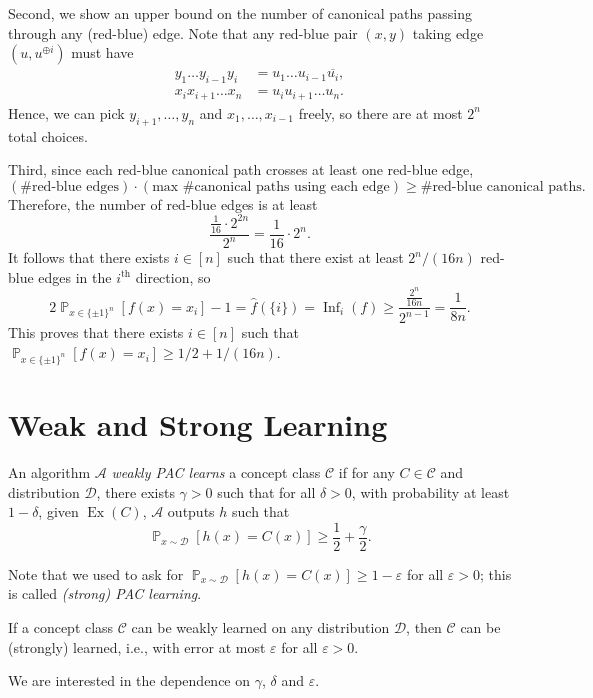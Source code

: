 \documentclass[letterpaper, reqno,11pt]{article}
\newcommand{\PP}{\mathop{{}\mathbb{P}}}
\DeclareMathOperator{\Ex}{Ex}
\DeclareMathOperator{\Inf}{Inf}
\begin{document}
Second, we show an upper bound on the number of canonical paths passing through any (red-blue) edge. Note that any red-blue pair $(x, y)$ taking edge $(u, u^{\oplus i})$ must have
\begin{align*}
  y_1 \ldots y_{i - 1} y_i &= u_1 \ldots u_{i - 1} \overline{u_i}, \\
  x_i x_{i + 1} \ldots x_n &= u_i u_{i + 1} \ldots u_n.
\end{align*}
Hence, we can pick $y_{i + 1}, \ldots, y_n$ and $x_1, \ldots, x_{i - 1}$ freely, so there are at most $2^n$ total choices.

Third, since each red-blue canonical path crosses at least one red-blue edge,
$$ (\text{\# red-blue edges}) \cdot (\text{max \# canonical paths using each edge}) \geq \text{\# red-blue canonical paths}. $$
Therefore, the number of red-blue edges is at least
$$ \frac{\frac{1}{16} \cdot 2^{2n}}{2^n} = \frac{1}{16} \cdot 2^n. $$
It follows that there exists $i \in [n]$ such that there exist at least $2^n/(16n)$ red-blue edges in the $i^\text{th}$ direction, so
$$ 2\PP_{x \in \{ \pm 1 \}^n}\left[f(x) = x_i\right] - 1 = \hat{f}(\{ i \}) = \Inf_i(f) \geq \frac{\frac{2^n}{16n}}{2^{n - 1}} = \frac{1}{8n}. $$
This proves that there exists $i \in [n]$ such that $\PP_{x \in \{ \pm 1 \}^n}[f(x) = x_i] \geq 1/2 + 1/(16n)$.

\section{Weak and Strong Learning}

\begin{definition}
  An algorithm $\mathcal A$ \emph{weakly PAC learns} a concept class $\mathcal C$ if for any $C \in \mathcal C$ and distribution $\mathcal D$, there exists $\gamma > 0$ such that for all $\delta > 0$, with probability at least $1 - \delta$, given $\Ex(C)$, $\mathcal A$ outputs $h$ such that
  \begin{equation} \label{eq:weak}
    \PP_{x \sim \mathcal D}[h(x) = C(x)] \geq \frac{1}{2} + \frac{\gamma}{2}.
  \end{equation}
\end{definition}

Note that we used to ask for $\PP_{x \sim \mathcal D}[h(x) = C(x)] \geq 1 - \varepsilon$ for all $\varepsilon > 0$; this is called \emph{(strong) PAC learning}.

\begin{theorem}
  If a concept class $\mathcal C$ can be weakly learned on any distribution $\mathcal D$, then $\mathcal C$ can be (strongly) learned, i.e., with error at most $\varepsilon$ for all $\varepsilon > 0$.
\end{theorem}

We are interested in the dependence on $\gamma$, $\delta$ and $\varepsilon$.
\end{document}
